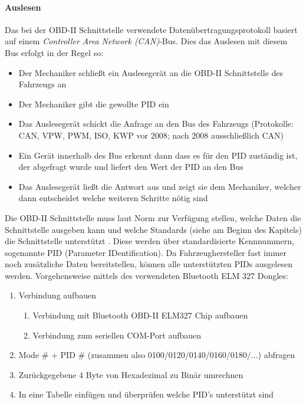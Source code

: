 \paragraph{Auslesen}
Das bei der OBD-II Schnittstelle verwendete Datenübertragungsprotokoll basiert auf einem \textit{Controller Area Network (CAN)}-Bus. Dies das Auslesen mit diesem Bus erfolgt in der Regel so:
\begin{itemize}
	\item Der Mechaniker schließt ein Auslesegerät an die OBD-II Schnittstelle des Fahrzeugs an
	\item Der Mechaniker gibt die gewollte PID ein
	\item Das Auslesegerät schickt die Anfrage an den Bus des Fahrzeugs (Protokolle: CAN, VPW, PWM, ISO, KWP vor 2008; nach 2008 ausschließlich CAN)
	\item Ein Gerät innerhalb des Bus erkennt dann dass es für den PID zuständig ist, der abgefragt wurde und liefert den Wert der PID an den Bus
	\item Das Auslesegerät ließt die Antwort aus und zeigt sie dem Mechaniker, welcher dann entscheidet welche weiteren Schritte nötig sind
\end{itemize} 

Die OBD-II Schnittstelle muss laut Norm zur Verfügung stellen, welche Daten die Schnittstelle ausgeben kann und welche Standards (siehe am Beginn des Kapitels) die Schnittstelle unterstützt \cite{SIMR.CH2-obd2.PIDMustHave}. Diese werden über standardisierte Kennnummern, sogenannte PID (Parameter IDentification). Da Fahrzeughersteller fast immer noch zusätzliche Daten bereitstellen, können alle unterstützten PIDs ausgelesen werden. Vorgehensweise mittels des verwendeten Bluetooth ELM 327 Dongles: 

\begin{enumerate}
	\item Verbindung aufbauen
	\begin{enumerate}
		\item Verbindung mit Bluetooth OBD-II ELM327 Chip aufbauen
		\item Verbindung zum seriellen COM-Port aufbauen 
	\end{enumerate}
	\item Mode \# + PID \# (zusammen also 0100/0120/0140/0160/0180/...) abfragen
	\item Zurückgegebene 4 Byte von Hexadezimal zu Binär umrechnen
	\item In eine Tabelle einfügen und überprüfen welche PID's unterstützt sind
\end{enumerate}

